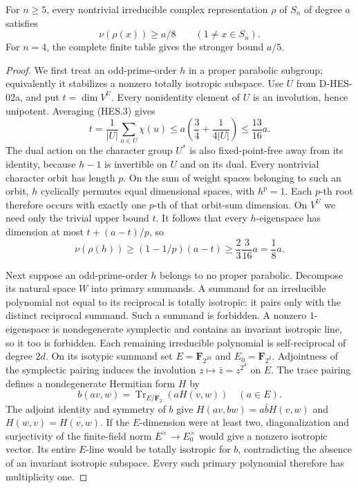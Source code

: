 \begin{lemma}
For $n\ge5$, every nontrivial irreducible complex representation $\rho$
of $S_n$ of degree $a$ satisfies
\[
                   \nu(\rho(x))\ge a/8\qquad(1\ne x\in S_n).
\tag{HES.5}
\]
For $n=4$, the complete finite table gives the stronger bound $a/5$.
\end{lemma}

\begin{proof}
We first treat an odd-prime-order $h$ in a proper parabolic subgroup;
equivalently it stabilizes a nonzero totally isotropic subspace. Use $U$
from D-HES-02a, and put $t=\dim V^U$. Every nonidentity element of $U$
is an involution, hence unipotent. Averaging (HES.3) gives
\[
       t=\frac1{|U|}\sum_{u\in U}\chi(u)
        \le a\left(\frac34+\frac1{4|U|}\right)
        \le\frac{13}{16}a.
\tag{HES.6}
\]
The dual action on the character group $U^*$ is also fixed-point-free
away from its identity, because $h-1$ is invertible on $U$ and on its
dual. Every nontrivial character orbit has length $p$. On the sum of
weight spaces belonging to such an orbit, $h$ cyclically permutes equal
dimensional spaces, with $h^p=1$. Each $p$-th root therefore occurs with
exactly one $p$-th of that orbit-sum dimension. On $V^U$ we need only the
trivial upper bound $t$. It follows that every $h$-eigenspace has
dimension at most $t+(a-t)/p$, so
\[
       \nu(\rho(h))\ge(1-1/p)(a-t)
                   \ge\frac23\frac3{16}a=\frac18a.
\tag{HES.7}
\]

Next suppose an odd-prime-order $h$ belongs to no proper parabolic.
Decompose its natural space $W$ into primary summands. A summand for
an irreducible polynomial not equal to its reciprocal is totally
isotropic: it pairs only with the distinct reciprocal summand. Such a
summand is forbidden. A nonzero $1$-eigenspace is nondegenerate symplectic
and contains an invariant isotropic line, so it too is forbidden.
Each remaining irreducible polynomial is self-reciprocal of degree $2d$.
On its isotypic summand set $E=\mathbf F_{2^{2d}}$ and
$E_0=\mathbf F_{2^d}$. Adjointness of the symplectic pairing induces the
involution $z\mapsto\bar z=z^{2^d}$ on $E$. The trace pairing defines a
nondegenerate Hermitian form $H$ by
\[
              b(av,w)=\operatorname{Tr}_{E/\mathbf F_2}(aH(v,w))
                         \quad(a\in E).
\]
The adjoint identity and symmetry of $b$ give
$H(av,bw)=a\bar b H(v,w)$ and $H(w,v)=\overline{H(v,w)}$.
If the $E$-dimension were at least two, diagonalization and surjectivity
of the finite-field norm $E^\times\to E_0^\times$ would give a nonzero
isotropic vector. Its entire $E$-line would be totally isotropic for $b$,
contradicting the absence of an invariant isotropic subspace.
Every such primary polynomial therefore has multiplicity one.


\end{proof}
